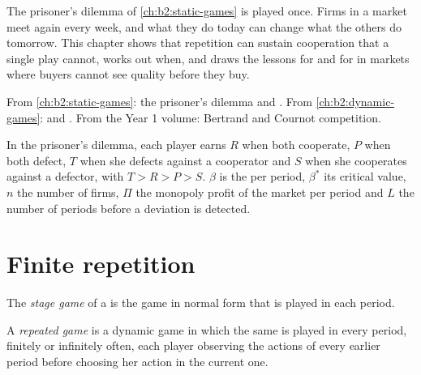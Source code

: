 The prisoner's dilemma of \cref{ch:b2:static-games} is played once. Firms in a market meet again every week,
and what they do today can change what the others do tomorrow. This chapter shows that repetition can sustain
cooperation that a single play cannot, works out when, and draws the lessons for  and for
 in markets where buyers cannot see quality before they buy.

\begin{recall}
From \cref{ch:b2:static-games}: the prisoner's dilemma and . From
\cref{ch:b2:dynamic-games}:  and . From the Year 1 volume:
Bertrand and Cournot competition.
\end{recall}

\begin{notation}\label{not:b2:repeated-games:symbols}
In the prisoner's dilemma, each player earns $R$ when both cooperate, $P$ when both defect, $T$ when she defects
against a cooperator and $S$ when she cooperates against a defector, with $T > R > P > S$. $\beta$ is the 
per period, $\beta^*$ its critical value, $n$ the number of firms, $\Pi$ the monopoly profit of the market per period and $L$
the number of periods before a deviation is detected.
\end{notation}

\section{Finite repetition}\label{sec:b2:repeated-games:finite}

\begin{definition}\label{def:b2:repeated-games:stage-game}
The \emph{stage game} of a  is the game in normal form that is played in each
period.
\end{definition}

\begin{definition}\label{def:b2:repeated-games:repeated-game}
A \emph{repeated game} is a dynamic game in which the same  is played in
every period, finitely or infinitely often, each player observing the actions of every earlier period before
choosing her action in the current one.
\end{definition}

